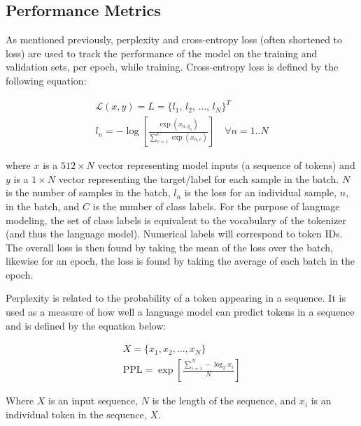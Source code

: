 \documentclass[12pt]{article}
\begin{document}
\subsection{Performance Metrics}\label{sec:performance_metrics}
As mentioned previously, perplexity and cross-entropy loss (often shortened to loss) are used to track the performance of the model on the training
and validation sets, per epoch, while training. Cross-entropy loss is defined by the following equation:

\begin{equation}\label{eq:cross_entropy_loss}
    \begin{gathered}
        \mathcal{L}(x, y) = L = \{\mbox{$l_1$, $l_2$, ..., $l_N$}\}^T\\
        l_n = -\log \left[\frac{\exp(x_{n,y_n})}{\sum_{c=1}^{C}\exp(x_{n,c})}\right] \quad \forall n=1..N
    \end{gathered}
\end{equation}

\noindent
where $x$ is a $512 \times N$ vector representing model inputs (a sequence of tokens) and $y$ is a $1 \times N$ vector representing the target/label
for each sample in the batch. $N$ is the number of samples in the batch, $l_n$ is the loss for an individual sample, $n$, in the batch, and $C$ is the
number of class labels. For the purpose of language modeling, the set of class labels is equivalent to the vocabulary of the tokenizer (and thus the
language model). Numerical labels will correspond to token IDs. The overall loss is then found by taking the mean of the loss over the batch, likewise
for an epoch, the loss is found by taking the average of each batch in the epoch.

Perplexity is related to the probability of a token appearing in a sequence. It is used as a measure of how well a language model can predict tokens
in a sequence and is defined by the equation below:

\begin{equation}\label{eq:perplexity}
    \begin{gathered}
        X = \{x_1, x_2, ..., x_N\}\\
        \mbox{PPL} = \exp\left[\frac{\sum_{i=1}^N - \log_2 x_i}{N}\right]
    \end{gathered}
\end{equation}

\noindent
Where $X$ is an input sequence, $N$ is the length of the sequence, and $x_i$ is an individual token in the sequence, $X$.
\end{document}
